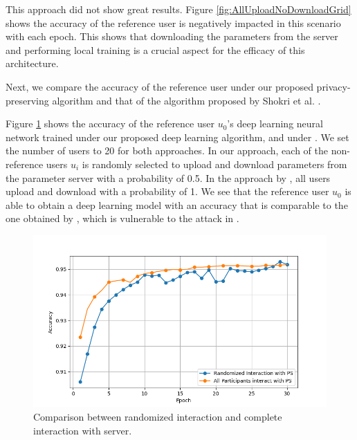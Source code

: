 \documentclass[letterpaper]{article}
\begin{document}
\begin{flushleft}
{This approach did not show great results. Figure \ref{fig:AllUploadNoDownloadGrid} shows the accuracy of the reference user is negatively impacted in this scenario with each epoch. This shows that downloading the parameters from the server and performing local training is a crucial aspect for the efficacy of this architecture.

Next, we compare the accuracy of the reference user under our proposed privacy-preserving algorithm and that of the algorithm proposed
by Shokri et al. \cite{shokri2015privacy}. 


Figure \ref{fig:RandVsAll} shows the accuracy of the reference user $u_0$'s deep learning
neural network trained under our proposed deep learning algorithm, and under \cite{shokri2015privacy}. We set the number of
users to 20 for both approaches. In our approach, each of the non-reference users $u_i$ is randomly
selected to upload and download parameters from the parameter server with a probability of 0.5. 
In the approach by \cite{shokri2015privacy}, all users upload and download with a probability of 1. 
We see that the reference user $u_0$ is able to obtain a deep learning model with an accuracy that is comparable to the one
obtained by \cite{shokri2015privacy}, which is vulnerable to the attack in \cite{hitaj2017deep}. 

\begin{figure}[H]
  \centering
    \includegraphics[width=5in]{RandomVsAllGrid.png}
    \caption[Comparison between randomized complete interaction with server.]{\label{fig:RandVsAll} Comparison between randomized interaction and complete interaction with server.}
  \end{figure}





}
\end{flushleft}
\end{document}
